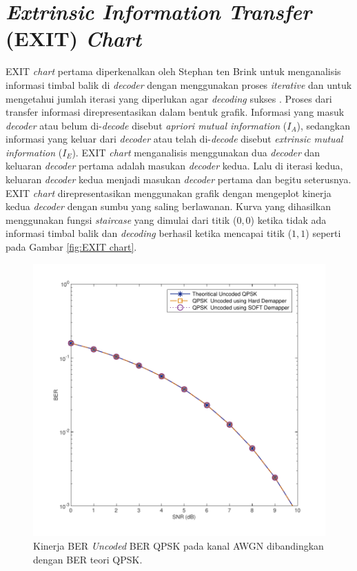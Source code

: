 \section{\textit{Extrinsic Information Transfer} (EXIT) \textit{Chart} }

EXIT \textit{chart} pertama diperkenalkan oleh Stephan ten Brink untuk menganalisis informasi timbal balik di \textit{decoder} dengan menggunakan proses \textit{iterative} dan untuk mengetahui jumlah iterasi yang diperlukan agar \textit{decoding} sukses \cite{exit23}. Proses dari transfer informasi direpresentasikan dalam bentuk grafik. Informasi yang masuk \textit{decoder} atau belum di-\textit{decode} disebut \textit{apriori mutual information} ($I_{A}$), sedangkan informasi yang keluar dari \textit{decoder} atau telah di-\textit{decode} disebut \textit{extrinsic mutual information} ($I_{E}$). EXIT \textit{chart} menganalisis menggunakan dua \textit{decoder} dan keluaran \textit{decoder} pertama adalah masukan \textit{decoder} kedua. Lalu di iterasi kedua, keluaran \textit{decoder} kedua menjadi masukan \textit{decoder} pertama dan begitu seterusnya. EXIT \textit{chart} direpresentasikan menggunakan grafik dengan mengeplot kinerja kedua \textit{decoder} dengan sumbu yang saling berlawanan. Kurva yang dihasilkan menggunakan fungsi \textit{staircase} yang dimulai dari titik ($0,0$) ketika tidak ada informasi timbal balik dan \textit{decoding} berhasil ketika mencapai titik ($1,1$) seperti pada Gambar \ref{fig:EXIT chart}. 		\ClearShipoutPicture

\begin{figure}[t!]

	\centering
	\includegraphics[width=1\textwidth]
	{pics/uncoded.pdf}
	\caption{Kinerja BER \textit{Uncoded} BER QPSK pada kanal AWGN dibandingkan dengan BER teori QPSK.}
	\label{fig:BER}

\end{figure}

